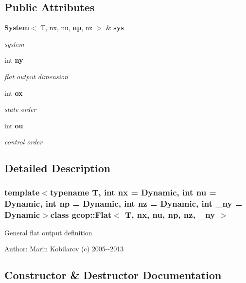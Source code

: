 \subsection*{\-Public \-Attributes}
\begin{DoxyCompactItemize}
\item 
{\bf \-System}$<$ \-T, nx, nu, {\bf np}, nz $>$ \& {\bf sys}
\begin{DoxyCompactList}\small\item\em system \end{DoxyCompactList}\item 
int {\bf ny}
\begin{DoxyCompactList}\small\item\em flat output dimension \end{DoxyCompactList}\item 
int {\bf ox}
\begin{DoxyCompactList}\small\item\em state order \end{DoxyCompactList}\item 
int {\bf ou}
\begin{DoxyCompactList}\small\item\em control order \end{DoxyCompactList}\end{DoxyCompactItemize}


\subsection{\-Detailed \-Description}
\subsubsection*{template$<$typename T, int nx = \-Dynamic, int nu = \-Dynamic, int np = \-Dynamic, int nz = \-Dynamic, int \-\_\-ny = \-Dynamic$>$class gcop\-::\-Flat$<$ T, nx, nu, np, nz, \-\_\-ny $>$}

\-General flat output definition

\-Author\-: \-Marin \-Kobilarov (c) 2005-\/-\/2013 

\subsection{\-Constructor \& \-Destructor \-Documentation}
